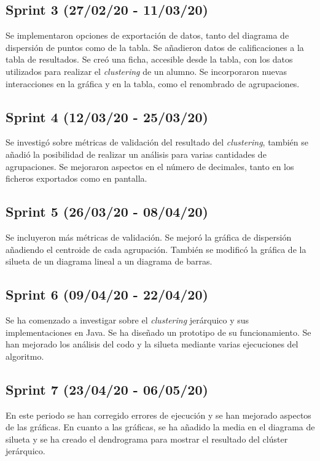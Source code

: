 \subsection{Sprint 3 (27/02/20 - 11/03/20)}
Se implementaron opciones de exportación de datos, tanto del diagrama de dispersión de puntos como de la tabla. Se añadieron datos de calificaciones a la tabla de resultados. Se creó una ficha, accesible desde la tabla, con los datos utilizados para realizar el \emph{clustering} de un alumno. Se incorporaron nuevas interacciones en la gráfica y en la tabla, como el renombrado de agrupaciones.

\subsection{Sprint 4 (12/03/20 - 25/03/20)}
Se investigó sobre métricas de validación del resultado del \emph{clustering}, también se añadió la posibilidad de realizar un análisis para varias cantidades de agrupaciones. Se mejoraron aspectos en el número de decimales, tanto en los ficheros exportados como en pantalla.

\subsection{Sprint 5 (26/03/20 - 08/04/20)}
Se incluyeron más métricas de validación. Se mejoró la gráfica de dispersión añadiendo el centroide de cada agrupación. También se modificó la gráfica de la silueta de un diagrama lineal a un diagrama de barras.

\subsection{Sprint 6 (09/04/20 - 22/04/20)}
Se ha comenzado a investigar sobre el \emph{clustering} jerárquico y sus implementaciones en Java. Se ha diseñado un prototipo de su funcionamiento. Se han mejorado los análisis del codo y la silueta mediante varias ejecuciones del algoritmo.

\subsection{Sprint 7 (23/04/20 - 06/05/20)}
En este periodo se han corregido errores de ejecución y se han mejorado aspectos de las gráficas. En cuanto a las gráficas, se ha añadido la media en el diagrama de silueta y se ha creado el dendrograma para mostrar el resultado del clúster jerárquico.

